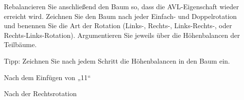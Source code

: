 \documentclass{bschlangaul-aufgabe}
\begin{document}
\begin{enumerate}
\begin{center}
\end{center}

Rebalancieren Sie anschließend den Baum so, dass die AVL-Eigenschaft
wieder erreicht wird. Zeichnen Sie den Baum nach jeder Einfach- und
Doppelrotation und benennen Sie die Art der Rotation (Links-, Rechts-,
Links-Rechts-, oder Rechts-Links-Rotation). Argumentieren Sie jeweils
über die Höhenbalancen der Teilbäume.

Tipp: Zeichnen Sie nach jedem Schritt die Höhenbalancen in den Baum ein.

\begin{bAntwort}
\begin{bBaum}{Nach dem Einfügen von „11“}
\end{bBaum}

\begin{bBaum}{Nach der Rechtsrotation}
\end{bBaum}
\end{bAntwort}
\end{enumerate}
\end{document}

